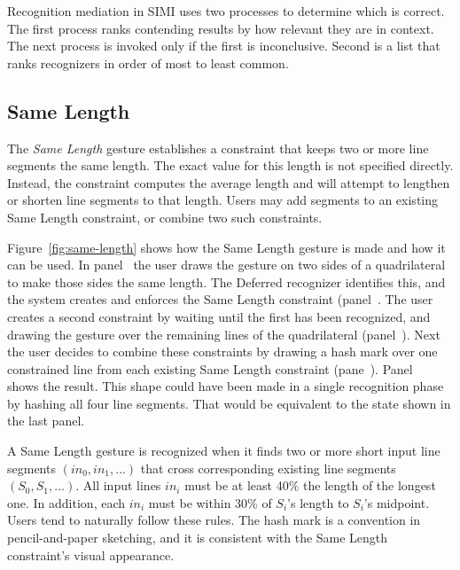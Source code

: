 Recognition mediation in SIMI uses two processes to determine which is
correct. The first process ranks contending results by how relevant
they are in context. The next process is invoked only if the first is
inconclusive. Second is a list that ranks recognizers in order of most
to least common.

\subsection{Same Length}

The \textit{Same Length} gesture establishes a constraint that keeps
two or more line segments the same length. The exact value for this
length is not specified directly. Instead, the constraint computes the
average length and will attempt to lengthen or shorten line segments
to that length. Users may add segments to an existing Same Length
constraint, or combine two such constraints. 



Figure~\ref{fig:same-length} shows how the Same Length gesture is made
and how it can be used. In panel~\textit{}
the user draws the gesture on two sides of a quadrilateral to make
those sides the same length. The Deferred recognizer identifies this,
and the system creates and enforces the Same Length constraint
(panel~\textit{}. The user creates a second
constraint by waiting until the first has been recognized, and drawing
the gesture over the remaining lines of the quadrilateral
(panel~\textit{}). Next the user decides to
combine these constraints by drawing a hash mark over one constrained
line from each existing Same Length constraint
(pane~\textit{}). Panel~\textit{}
shows the result. This shape could have been made in a single
recognition phase by hashing all four line segments. That would be
equivalent to the state shown in the last panel.

A Same Length gesture is recognized when it finds two or more short
input line segments $(in_0, in_1, ...)$ that cross corresponding
existing line segments $(S_0, S_1, ...)$. All input lines $in_i$ must
be at least 40\% the length of the longest one. In addition, each
$in_i$ must be within 30\% of $S_i$'s length to $S_i$'s
midpoint. Users tend to naturally follow these rules. The hash mark is
a convention in pencil-and-paper sketching, and it is consistent with
the Same Length constraint's visual appearance.

